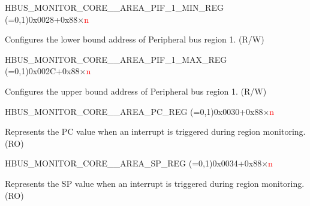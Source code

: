 \begin{register}{H}{BUS\_MONITOR\_CORE\_\_AREA\_PIF\_1\_MIN\_REG (=0,1)}{0x0028+0x88×\textcolor{red}{n}}\label{regdesc:BUSMONITORCORE0AREAPIF1MINREG}
%
\regnewline%
\begin{regdesc}\begin{reglist}
\label{fielddesc:BUSMONITORCORE0AREAPIF1MIN}\item [BUS\_MONITOR\_CORE\_\regindex{n}\_AREA\_PIF\_1\_MIN] Configures the lower bound address of Peripheral bus region 1. (R/W)
\end{reglist}\end{regdesc}
\end{register}


\begin{register}{H}{BUS\_MONITOR\_CORE\_\_AREA\_PIF\_1\_MAX\_REG (=0,1)}{0x002C+0x88×\textcolor{red}{n}}\label{regdesc:BUSMONITORCORE0AREAPIF1MAXREG}
%
\regnewline%
\begin{regdesc}\begin{reglist}
\label{fielddesc:BUSMONITORCORE0AREAPIF1MAX}\item [BUS\_MONITOR\_CORE\_\regindex{n}\_AREA\_PIF\_1\_MAX] Configures the upper bound address of Peripheral bus region 1. (R/W)
\end{reglist}\end{regdesc}
\end{register}


\begin{register}{H}{BUS\_MONITOR\_CORE\_\_AREA\_PC\_REG (=0,1)}{0x0030+0x88×\textcolor{red}{n}}\label{regdesc:BUSMONITORCORE0AREAPCREG}
%
\regnewline%
\begin{regdesc}\begin{reglist}
\label{fielddesc:BUSMONITORCORE0AREAPC}\item [BUS\_MONITOR\_CORE\_\regindex{n}\_AREA\_PC] Represents the PC value when an interrupt is triggered during region monitoring. (RO)
\end{reglist}\end{regdesc}
\end{register}


\begin{register}{H}{BUS\_MONITOR\_CORE\_\_AREA\_SP\_REG (=0,1)}{0x0034+0x88×\textcolor{red}{n}}\label{regdesc:BUSMONITORCORE0AREASPREG}
%
\regnewline%
\begin{regdesc}\begin{reglist}
\label{fielddesc:BUSMONITORCORE0AREASP}\item [BUS\_MONITOR\_CORE\_\regindex{n}\_AREA\_SP] Represents the SP value when an interrupt is triggered during region monitoring. (RO)
\end{reglist}\end{regdesc}
\end{register}


